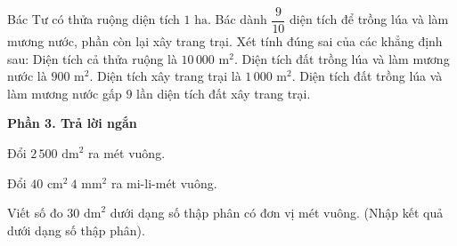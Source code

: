 \begin{ex} %
Bác Tư có thửa ruộng diện tích $1\text{ ha}$. Bác dành $\dfrac{9}{10}$ diện tích để trồng lúa và làm mương nước, phần còn lại xây trang trại. Xét tính đúng sai của các khẳng định sau:
\choiceTF
{\True Diện tích cả thửa ruộng là $10\,000\text{ m}^2$.}
{Diện tích đất trồng lúa và làm mương nước là $900\text{ m}^2$.}
{\True Diện tích xây trang trại là $1\,000\text{ m}^2$.}
{\True Diện tích đất trồng lúa và làm mương nước gấp $9$ lần diện tích đất xây trang trại.}
\end{ex}

\textbf{Phần 3. Trả lời ngắn}

\begin{ex} %
Đổi $2\,500\text{ dm}^2$ ra mét vuông.
\end{ex}

\begin{ex} %
Đổi $40\text{ cm}^2\ 4\text{ mm}^2$ ra mi-li-mét vuông.
\end{ex}

\begin{ex} %
Viết số đo $30\text{ dm}^2$ dưới dạng số thập phân có đơn vị mét vuông. (Nhập kết quả dưới dạng số thập phân).
\end{ex}

